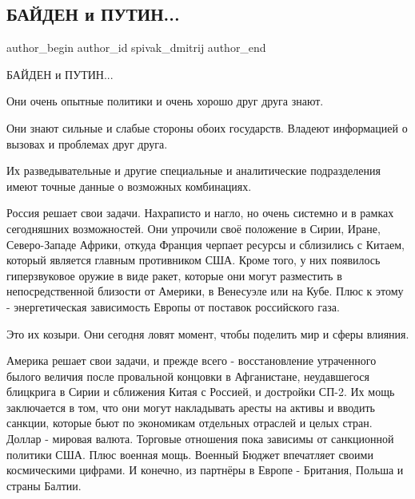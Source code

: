  
 
 
 
 
 
\subsection{БАЙДЕН и ПУТИН...}
\label{sec:22_02_2022.fb.spivak_dmitrij.2.bajden_i_putin}
 
\ifcmt
 author_begin
   author_id spivak_dmitrij
 author_end
\fi

БАЙДЕН и ПУТИН... 

Они очень опытные политики и очень хорошо друг друга знают. 

Они знают сильные и слабые стороны обоих государств. Владеют информацией о
вызовах и проблемах друг друга. 

Их разведывательные и другие специальные и аналитические подразделения имеют
точные данные о возможных комбинациях. 

Россия решает свои задачи. Нахраписто и нагло, но очень системно и в рамках
сегодняшних возможностей. Они упрочили своё положение в Сирии, Иране,
Северо-Западе Африки, откуда Франция черпает ресурсы и сблизились с Китаем,
который является главным противником США. Кроме того, у них появилось
гиперзвуковое оружие в виде ракет, которые они могут разместить в
непосредственной близости от Америки, в Венесуэле или на Кубе. Плюс к этому -
энергетическая зависимость Европы от поставок российского газа. 

Это их козыри. Они сегодня ловят момент, чтобы поделить мир и сферы влияния.

Америка решает свои задачи, и прежде всего - восстановление утраченного былого
величия после провальной концовки в Афганистане, неудавшегося блицкрига в Сирии
и сближения Китая с Россией, и достройки СП-2. Их мощь заключается в том, что
они могут накладывать аресты на активы и вводить санкции, которые бьют по
экономикам отдельных отраслей и целых стран. Доллар - мировая валюта. Торговые
отношения пока зависимы от санкционной политики США. Плюс военная мощь. Военный
Бюджет впечатляет своими космическими цифрами. И конечно, из партнёры в Европе
- Британия, Польша и страны Балтии. 


